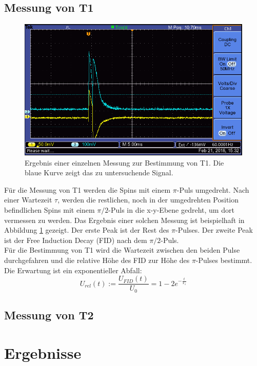 \documentclass[12pt,a4paper]{article}
\begin{document}
\subsection{Messung von T1}

\begin{figure}
\centering
\includegraphics[scale=0.8]{Bilder/F0003TEK.PNG}
\caption{Ergebnis einer einzelnen Messung zur Bestimmung von T1. Die blaue Kurve zeigt das zu untersuchende Signal.}
\label{fig:MessungT1_Beispiel}
\end{figure}

Für die Messung von T1 werden die Spins mit einem $\pi$-Puls umgedreht. Nach einer Wartezeit $\tau$, werden die restlichen, noch in der umgedrehten Position befindlichen Spins mit einem $\pi /2$-Puls in die x-y-Ebene gedreht, um dort vermessen zu werden. Das Ergebnis einer solchen Messung ist beispielhaft in Abbildung \ref{fig:MessungT1_Beispiel} gezeigt. Der erste Peak ist der Rest des $\pi$-Pulses. Der zweite Peak ist der Free Induction Decay (FID) nach dem $\pi /2$-Puls. \\
Für die Bestimmung von T1 wird die Wartezeit zwischen den beiden Pulse durchgefahren und die relative Höhe des FID zur Höhe des $\pi$-Pulses bestimmt. Die Erwartung ist ein exponentieller Abfall:
\begin{equation}
\label{eq:T1_Exponentialfunktion}
U_{rel} (t) := \dfrac{U_{FID} (t)}{U_0} = 1 - 2 e^{-\frac{t}{T_1}}
\end{equation}


\subsection{Messung von T2}


\section{Ergebnisse}
\end{document}
